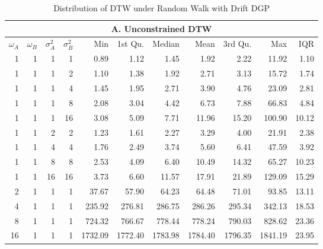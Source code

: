 \begin{table}[!ht]
    \centering
    \fontsize{10pt}{10pt}\selectfont
    \begin{threeparttable}
        \caption{Distribution of DTW under Random Walk with Drift DGP} \label{tbl:dtw_random_walk_with_drift}
        \begin{tabular}{r r r r | r r r r r r r}
            \multicolumn{11}{c}{\textbf{A. Unconstrained DTW}} \\
            \midrule
            $\omega_{A}$ & $\omega_{B}$ & $\sigma^{2}_{A}$ & $\sigma^{2}_{B}$ & Min & 1st Qu. & Median & Mean & 3rd Qu. & Max & IQR \\
            \midrule
            1  & 1 & 1  & 1  &    0.89 &    1.12 &    1.45 &    1.92 &    2.22 &   11.92 &  1.10 \\
            \midrule
            1  & 1 & 1  & 2  &    1.10 &    1.38 &    1.92 &    2.71 &    3.13 &   15.72 &  1.74 \\
            1  & 1 & 1  & 4  &    1.45 &    1.95 &    2.71 &    3.90 &    4.76 &   23.09 &  2.81 \\
            1  & 1 & 1  & 8  &    2.08 &    3.04 &    4.42 &    6.73 &    7.88 &   66.83 &  4.84 \\
            1  & 1 & 1  & 16 &    3.08 &    5.09 &    7.71 &   11.96 &   15.20 &  100.90 & 10.12 \\
            \midrule
            1  & 1 & 2  & 2  &    1.23 &    1.61 &    2.27 &    3.29 &    4.00 &   21.91 &  2.38 \\
            1  & 1 & 4  & 4  &    1.76 &    2.49 &    3.74 &    5.60 &    6.41 &   47.59 &  3.92 \\
            1  & 1 & 8  & 8  &    2.53 &    4.09 &    6.40 &   10.49 &   14.32 &   65.27 & 10.23 \\
            1  & 1 & 16 & 16 &    3.73 &    6.60 &   11.57 &   17.91 &   21.89 &  129.09 & 15.29 \\
            \midrule
            2  & 1 & 1  & 1  &   37.67 &   57.90 &   64.23 &   64.48 &   71.01 &   93.85 & 13.11 \\
            4  & 1 & 1  & 1  &  235.92 &  276.81 &  286.75 &  286.26 &  295.34 &  342.13 & 18.53 \\
            8  & 1 & 1  & 1  &  724.32 &  766.67 &  778.44 &  778.24 &  790.03 &  828.62 & 23.36 \\
            16 & 1 & 1  & 1  & 1732.09 & 1772.40 & 1783.98 & 1784.40 & 1796.35 & 1841.19 & 23.95 \\
            \hline

\end{tabular}
\end{threeparttable}
\end{table}
